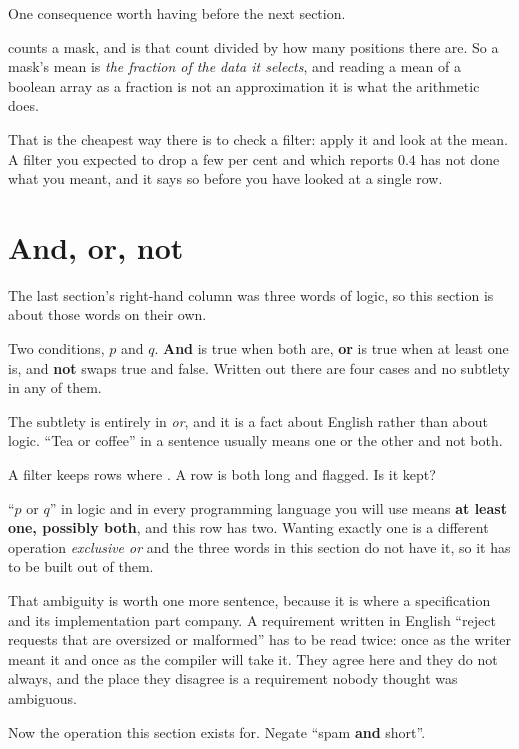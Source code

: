 \begin{fr}
One consequence worth having before the next section.

 counts a mask, and  is that count divided by how
many positions there are. So a mask's mean is \emph{the fraction of the data
it selects}, and reading a mean of a boolean array as a fraction is not an
approximation \dash{} it is what the arithmetic does.

That is the cheapest way there is to check a filter: apply it and look at the
mean. A filter you expected to drop a few per cent and which reports
$\num{0.4}$ has not done what you meant, and it says so before you have looked
at a single row.
\end{fr}

\section{And, or, not}
\label{sec:F10-logic}

\begin{fr}
The last section's right-hand column was three words of logic, so this section
is about those words on their own.

Two conditions, $p$ and $q$. \textbf{And} is true when both are, \textbf{or} is
true when at least one is, and \textbf{not} swaps true and false. Written out
there are four cases and no subtlety in any of them.

The subtlety is entirely in \emph{or}, and it is a fact about English rather
than about logic. \enquote{Tea or coffee} in a sentence usually means one or
the other and not both.

A filter keeps rows where . A row is both long
and flagged. Is it kept?
\nextframe
\end{fr}

\begin{fr}
\enquote{$p$ or $q$} in logic and in every programming language you will use
means \textbf{at least one, possibly both}, and this row has two. Wanting
exactly one is a different operation \dash{} \emph{exclusive or} \dash{} and
the three words in this section do not have it, so it has to be built out of
them.

That ambiguity is worth one more sentence, because it is where a
specification and its implementation part company. A requirement written in
English \dash{} \enquote{reject requests that are oversized or malformed}
\dash{} has to be read twice: once as the writer meant it and once as the
compiler will take it. They agree here and they do not always, and the place
they disagree is a requirement nobody thought was ambiguous.

Now the operation this section exists for. Negate \enquote{spam \textbf{and}
short}.
\dotline
\nextframe
\end{fr}

